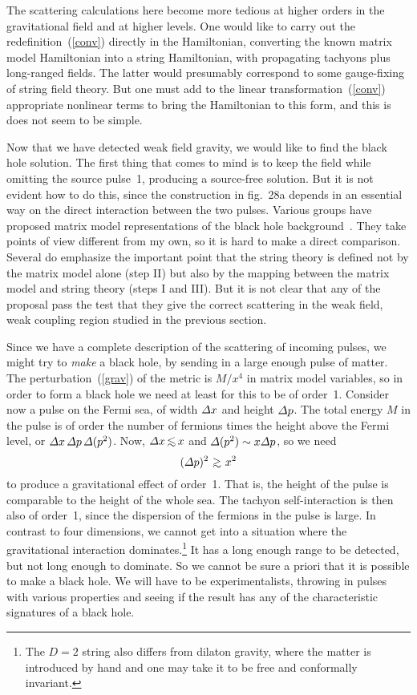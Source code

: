 The scattering calculations here become more tedious at
higher orders in the gravitational field and at higher
levels.  One would like to carry out the redefinition~(\ref{conv})
directly in the Hamiltonian, converting the known matrix model
Hamiltonian into a string Hamiltonian, with propagating tachyons
plus long-ranged fields.  The latter would presumably correspond
to some gauge-fixing of string field theory.  But
one must add to the linear
transformation~(\ref{conv}) appropriate nonlinear terms to bring
the Hamiltonian to this form, and this is does not seem to be
simple.


Now that we have detected weak field gravity, we would like to
find the black hole solution.  The first thing that comes to
mind is to keep the field while omitting the source pulse~1,
producing a source-free solution.  But it is not evident how to
do this, since the construction in fig.~28a depends in an
essential way on the direct interaction between the two pulses.
Various groups have proposed
matrix model representations of the black hole
background~\cite{mmbh}.  They take points of view different from my
own, so it is hard to make a direct comparison.  Several do emphasize
the important point that the string theory is defined not by the
matrix model alone  (step II) but also by the mapping between the
matrix model and string theory (steps I and III).
But it is not clear that any of the proposal pass the test that
they give the correct scattering in the weak field, weak coupling
region studied in the previous section.

Since we have a complete description of the scattering of
incoming pulses, we might try to {\it make} a black hole, by
sending in a large enough pulse of matter.  The
perturbation~(\ref{grav}) of the metric is $M/x^4$ in matrix model
variables, so in order to form a black hole we need at least for
this to be of order~1. Consider now a pulse on the Fermi sea, of
width ${\mit \Delta} x$ and height ${\mit \Delta} p$.  The total
energy $M$ in the pulse is of order the number of fermions times
the height above the Fermi level, or ${\mit \Delta} x\,{\mit
\Delta} p \, {\mit \Delta} (p^2)$.  Now, ${\mit \Delta} x 
\,\roughly{<}\, x$ and ${\mit \Delta} (p^2) \sim x {\mit \Delta} p$, so
we need
\begin{equation}
({\mit \Delta} p)^2\ \roughly{>}\ x^2
\end{equation}
to produce a gravitational effect of order~1.  That is, the
height of the pulse is comparable to the height of the whole sea.
The tachyon self-interaction is then also of order~1, since the
dispersion of the fermions in the pulse is large.  In
contrast to four dimensions, we cannot get into a situation
where the gravitational interaction dominates.\footnote
{The $D=2$ string also differs from dilaton gravity, where the
matter is introduced by hand and one may take it to be free and
conformally invariant.}
It has a long
enough range to be detected, but not long enough to dominate.
So we cannot be sure a priori that it is possible to make a
black hole.  We will have to be experimentalists, throwing in
pulses with various properties and seeing if the result has any
of the characteristic signatures of a black hole.


